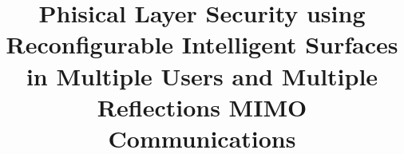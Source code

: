\documentclass[conference]{IEEEtran}
\begin{document}
\title{Phisical Layer Security using Reconfigurable Intelligent Surfaces in Multiple Users and Multiple Reflections MIMO Communications}


\author{
}

\maketitle



\IEEEpeerreviewmaketitle











\end{document}
